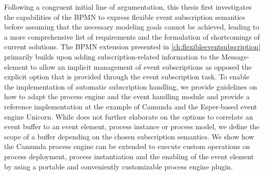 Following a congruent initial line of argumentation, this thesis first investigates the capabilities of the BPMN to express flexible event subscription semantics before assuming that the necessary modeling goals cannot be achieved, leading to a more comprehensive list of requirements and the formulation of shortcomings of current solutions.
The BPMN extension presented in \autoref{ch:flexibleeventsubscription} primarily builds upon adding subscription-related information to the Message-element to allow an implicit management of event subscriptions as opposed the explicit option that is provided through the event subscription task.
To enable the implementation of automatic subscription handling, we provide guidelines on how to adapt the process engine and the event handling module and provide a reference implementation at the example of Camunda and the Esper-based event engine Unicorn. 
While \cite{mandal:2017} does not further elaborate on the options to correlate an event buffer to an event element, process instance or process model, we define the scope of a buffer depending on the chosen subscription semantics.
We show how the Camunda process engine can be extended to execute custom operations on process deployment, process instantiation and the enabling of the event element by using a portable and conveniently customizable process engine plugin. %




